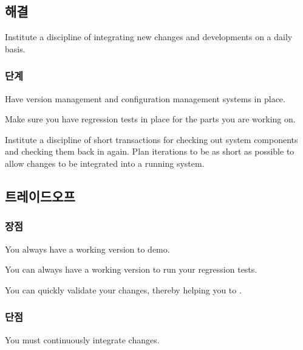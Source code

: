 \documentclass[a4paper,10pt,twoside]{book}
\begin{document}
\subsection*{해결}

Institute a discipline of integrating new changes and developments on a daily basis.

\subsubsection*{단계}

\begin{bulletlist}
\item Have version management and configuration management systems in place.

\item Make sure you have regression tests in place for the parts you are working on.

\item Institute a discipline of short transactions for checking out system components and checking them back in again. Plan iterations to be as short as possible to allow changes to be integrated into a running system.
\end{bulletlist}

\subsection*{트레이드오프}

\subsubsection*{장점}

\begin{bulletlist}
\item You always have a working version to demo.

\item You can always have a working version to run your regression tests.

\item You can quickly validate your changes, thereby helping you to .
\end{bulletlist}

\subsubsection*{단점}

\begin{bulletlist}
\item You must continuously integrate changes.
\end{bulletlist}
\end{document}
